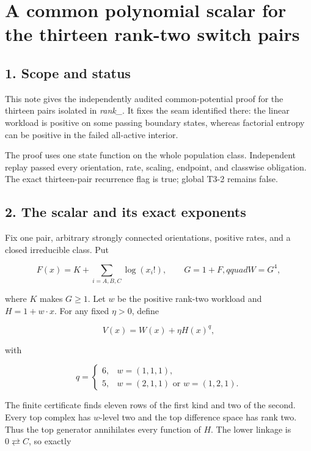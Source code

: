 \section{A common polynomial scalar for the thirteen rank-two switch
pairs}

\subsection{1. Scope and status}

This note gives the independently audited common-potential proof for the
thirteen pairs isolated in \emph{rank\_\texttt{}}. It
fixes the seam identified there: the linear workload is positive on some
passing boundary states, whereas factorial entropy can be positive in
the failed all-active interior.

The proof uses one state function on the whole population class.
Independent replay passed every orientation, rate, scaling, endpoint,
and classwise obligation. The exact thirteen-pair recurrence flag is
true; global T3-2 remains false.

\subsection{2. The scalar and its exact
exponents}

Fix one pair, arbitrary strongly connected orientations, positive rates,
and a closed irreducible class. Put

\[
 F(x)=K+\sum_{i=A,B,C}\log(x_i!),\qquad
 G=1+F,qquad W=G^4,                                  \tag{2.1}
\]

where \(K\) makes \(G\ge1\). Let \(w\) be the positive rank-two workload
and \(H=1+w\cdot x\). For any fixed \(\eta>0\), define

\[
 V(x)=W(x)+\eta H(x)^q,                               \tag{2.2}
\]

with

\[
 q=\begin{cases}
 6,&w=(1,1,1),\\
 5,&w=(2,1,1)\text{ or }w=(1,2,1).
 \end{cases}                                         \tag{2.3}
\]

The finite certificate finds eleven rows of the first kind and two of
the second. Every top complex has \(w\)-level two and the top difference
space has rank two. Thus the top generator annihilates every function of
\(H\). The lower linkage is \(0\rightleftarrows C\), so exactly

